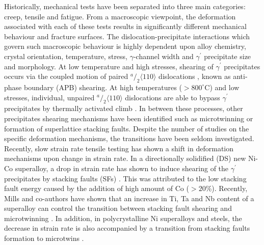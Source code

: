 \documentclass[a4paper,12pt,times,numbered,print,index]{Classes/PhDThesisPSnPDF}
\begin{document}
Historically, mechanical tests have been separated into three main categories: creep, tensile and fatigue. From a macroscopic viewpoint, the deformation associated with each of these tests results in significantly different mechanical behaviour and fracture surfaces. The dislocation-precipitate interactions which govern such macroscopic behaviour is highly dependent upon alloy chemistry, crystal orientation, temperature, stress,  $\gamma$-channel width and $\gamma^\prime$ precipitate size and morphology.
At low temperature and high stresses, shearing of $\gamma^\prime$ precipitates occurs via the coupled motion of paired $^a/_2 \langle 110 \rangle$ dislocations \cite{}, known as anti-phase boundary (APB) shearing. At high temperatures ($> 800^{\circ}$C) and low stresses, individual, unpaired $^a/_2 \langle 110 \rangle$ dislocations are able to bypass $\gamma^\prime$ precipitates by thermally activated climb \cite{}. In between these processes, other precipitates shearing mechanisms have been identified such as microtwinning or formation of superlattice stacking faults. %
Despite the number of studies on the specific deformation mechanisms, the transitions have been seldom investigated. Recently, slow strain rate tensile testing has shown a shift in deformation mechanisms upon change in strain rate. In a directionally solidified (DS) new Ni-Co superalloy, a drop in strain rate has shown to induce shearing of the $\gamma^{\prime}$ precipitates by stacking faults (SFs) \cite{Cui2011}. This was attributed to the low stacking fault energy caused by the addition of high amount of Co ($>20$\%). Recently, Mills  and co-authors have shown that an increase in Ti, Ta and Nb content of a superalloy can control the transition between stacking fault shearing and microtwinning \cite{}. In addition, in polycrystalline Ni superalloys and steels, the decrease in strain rate is also accompanied by a transition from stacking faults formation to microtwins \cite{}. %
\end{document}
